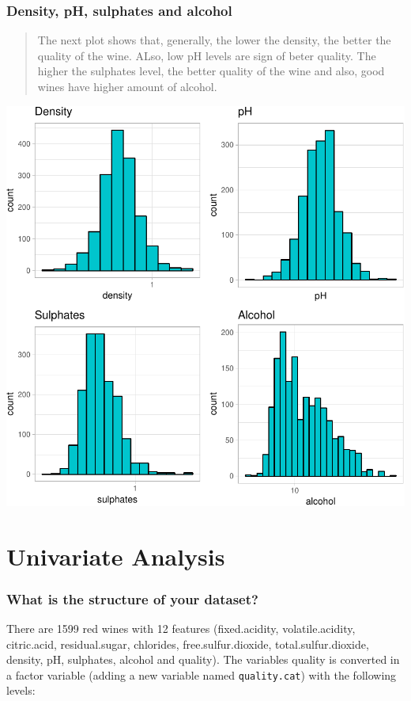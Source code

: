 \documentclass[]{article}
\begin{document}
\subsubsection{Density, pH, sulphates and
alcohol}\label{density-ph-sulphates-and-alcohol}

\begin{quote}
The next plot shows that, generally, the lower the density, the better
the quality of the wine. ALso, low pH levels are sign of beter quality.
The higher the sulphates level, the better quality of the wine and also,
good wines have higher amount of alcohol.
\end{quote}

\includegraphics{Figs/Univariate_Plots_density-1.pdf}

\section{Univariate Analysis}\label{univariate-analysis}

\subsubsection{What is the structure of your
dataset?}\label{what-is-the-structure-of-your-dataset}

There are 1599 red wines with 12 features (fixed.acidity,
volatile.acidity, citric.acid, residual.sugar, chlorides,
free.sulfur.dioxide, total.sulfur.dioxide, density, pH, sulphates,
alcohol and quality). The variables quality is converted in a factor
variable (adding a new variable named \texttt{quality.cat}) with the
following levels:
\end{document}
